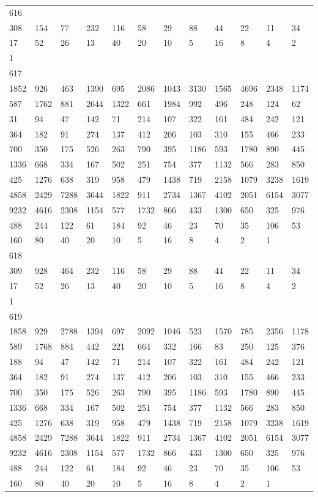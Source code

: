 \begin{longtable}{llllllllllll}
616&&&&&&&&&&&\\
308& 154& 77& 232& 116& 58& 29& 88& 44& 22& 11& 34\\
17& 52& 26& 13& 40& 20& 10& 5& 16& 8& 4& 2\\
1& \\

617&&&&&&&&&&&\\
1852& 926& 463& 1390& 695& 2086& 1043& 3130& 1565& 4696& 2348& 1174\\
587& 1762& 881& 2644& 1322& 661& 1984& 992& 496& 248& 124& 62\\
31& 94& 47& 142& 71& 214& 107& 322& 161& 484& 242& 121\\
364& 182& 91& 274& 137& 412& 206& 103& 310& 155& 466& 233\\
700& 350& 175& 526& 263& 790& 395& 1186& 593& 1780& 890& 445\\
1336& 668& 334& 167& 502& 251& 754& 377& 1132& 566& 283& 850\\
425& 1276& 638& 319& 958& 479& 1438& 719& 2158& 1079& 3238& 1619\\
4858& 2429& 7288& 3644& 1822& 911& 2734& 1367& 4102& 2051& 6154& 3077\\
9232& 4616& 2308& 1154& 577& 1732& 866& 433& 1300& 650& 325& 976\\
488& 244& 122& 61& 184& 92& 46& 23& 70& 35& 106& 53\\
160& 80& 40& 20& 10& 5& 16& 8& 4& 2& 1& \\

618&&&&&&&&&&&\\
309& 928& 464& 232& 116& 58& 29& 88& 44& 22& 11& 34\\
17& 52& 26& 13& 40& 20& 10& 5& 16& 8& 4& 2\\
1& \\

619&&&&&&&&&&&\\
1858& 929& 2788& 1394& 697& 2092& 1046& 523& 1570& 785& 2356& 1178\\
589& 1768& 884& 442& 221& 664& 332& 166& 83& 250& 125& 376\\
188& 94& 47& 142& 71& 214& 107& 322& 161& 484& 242& 121\\
364& 182& 91& 274& 137& 412& 206& 103& 310& 155& 466& 233\\
700& 350& 175& 526& 263& 790& 395& 1186& 593& 1780& 890& 445\\
1336& 668& 334& 167& 502& 251& 754& 377& 1132& 566& 283& 850\\
425& 1276& 638& 319& 958& 479& 1438& 719& 2158& 1079& 3238& 1619\\
4858& 2429& 7288& 3644& 1822& 911& 2734& 1367& 4102& 2051& 6154& 3077\\
9232& 4616& 2308& 1154& 577& 1732& 866& 433& 1300& 650& 325& 976\\
488& 244& 122& 61& 184& 92& 46& 23& 70& 35& 106& 53\\
160& 80& 40& 20& 10& 5& 16& 8& 4& 2& 1& \\


\end{longtable}
